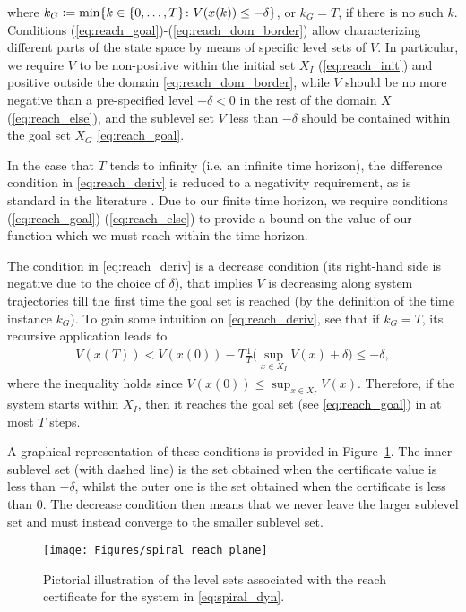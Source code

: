        where $k_G \vcentcolon= \min \{k \in \{0,\dots,T\} \colon V(x(k)) \leq -\delta\}$, or $k_G=T$, if there is no such $k$.
Conditions (\ref{eq:reach_goal})-(\ref{eq:reach_dom_border}) allow characterizing different parts of the state space by means of specific level sets of $V$. In particular, we require $V$ to be non-positive within the initial set $X_I$ (\ref{eq:reach_init}) and positive outside the domain \eqref{eq:reach_dom_border}, while $V$ should be no more negative than a pre-specified level $-\delta<0$ in the rest of the domain $X$  (\ref{eq:reach_else}), and the sublevel set $V$ less than $-\delta$ should be contained within the goal set $X_G$ \eqref{eq:reach_goal}. 

In the case that $T$ tends to infinity (i.e. an infinite time horizon), the difference condition in \eqref{eq:reach_deriv} is reduced to a negativity requirement, as is standard in the literature \cite{DBLP:conf/hybrid/EdwardsPA24}.
Due to our finite time horizon, we require conditions (\ref{eq:reach_goal})-(\ref{eq:reach_else}) to provide a bound on the value of our function which we must reach within the time horizon.

The condition in \eqref{eq:reach_deriv} is a decrease condition (its right-hand side is negative due to the choice of $\delta$), that implies $V$ is decreasing along system trajectories till the first time the goal set is reached (by the definition of the time instance $k_G$). 
To gain some intuition on \eqref{eq:reach_deriv}, see that if $k_G = T$, its recursive application leads to 
\begin{align}
V(x(T)) < V(x(0)) - T \frac{1}{T} \Big( \sup_{x \in X_I} V(x) + \delta \Big) \leq -\delta, \label{eq:proof_decr}
\end{align}
where the inequality holds since $V(x(0)) \leq \sup_{x \in X_I}V(x)$. Therefore, if the system starts within $X_I$, then it reaches the goal set (see \eqref{eq:reach_goal}) in at most $T$ steps.

A graphical representation of these conditions is provided in Figure~\ref{fig:spiral_reach_plane}.
The inner sublevel set (with dashed line) is the set obtained when the certificate value is less than $-\delta$, whilst the outer one is the set obtained when the certificate is less than $0$. 
The decrease condition then means that we never leave the larger sublevel set and must instead converge to the smaller sublevel set.

\begin{figure}
	\centering
	\texttt{[image: Figures/spiral\_reach\_plane]}
	\caption{Pictorial illustration of the level sets associated with the reach certificate for the system in \eqref{eq:spiral_dyn}.}
	\label{fig:spiral_reach_plane}
\end{figure}

